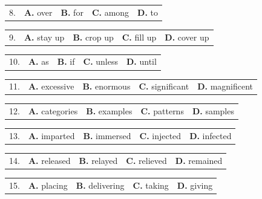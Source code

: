 \documentclass[UTF8,11pt]{ctexart}
\begin{document}
\noindent\begin{tabularx}{\linewidth}{@{}lXXXX@{}}8. & \textbf{A.} over & \textbf{B.} for & \textbf{C.} among & \textbf{D.} to\\\end{tabularx}\par

\noindent\begin{tabularx}{\linewidth}{@{}lXXXX@{}}9. & \textbf{A.} stay up & \textbf{B.} crop up & \textbf{C.} fill up & \textbf{D.} cover up\\\end{tabularx}\par

\noindent\begin{tabularx}{\linewidth}{@{}lXXXX@{}}10. & \textbf{A.} as & \textbf{B.} if & \textbf{C.} unless & \textbf{D.} until\\\end{tabularx}\par

\noindent\begin{tabularx}{\linewidth}{@{}lXXXX@{}}11. & \textbf{A.} excessive & \textbf{B.} enormous & \textbf{C.} significant & \textbf{D.} magnificent\\\end{tabularx}\par

\noindent\begin{tabularx}{\linewidth}{@{}lXXXX@{}}12. & \textbf{A.} categories & \textbf{B.} examples & \textbf{C.} patterns & \textbf{D.} samples\\\end{tabularx}\par

\noindent\begin{tabularx}{\linewidth}{@{}lXXXX@{}}13. & \textbf{A.} imparted & \textbf{B.} immersed & \textbf{C.} injected & \textbf{D.} infected\\\end{tabularx}\par

\noindent\begin{tabularx}{\linewidth}{@{}lXXXX@{}}14. & \textbf{A.} released & \textbf{B.} relayed & \textbf{C.} relieved & \textbf{D.} remained\\\end{tabularx}\par

\noindent\begin{tabularx}{\linewidth}{@{}lXXXX@{}}15. & \textbf{A.} placing & \textbf{B.} delivering & \textbf{C.} taking & \textbf{D.} giving\\\end{tabularx}\par
\end{document}
